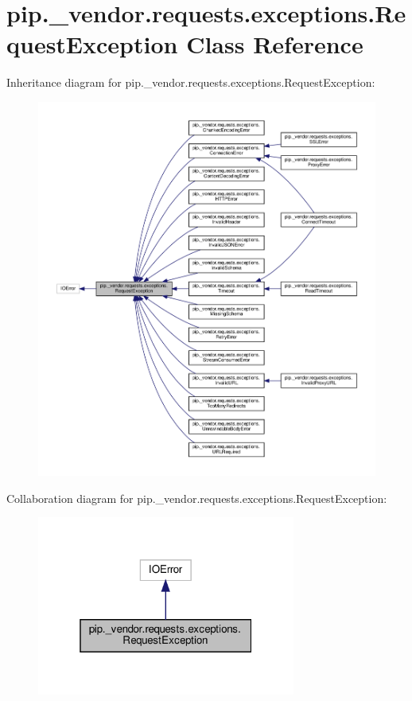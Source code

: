 \hypertarget{classpip_1_1__vendor_1_1requests_1_1exceptions_1_1RequestException}{}\section{pip.\+\_\+vendor.\+requests.\+exceptions.\+Request\+Exception Class Reference}
\label{classpip_1_1__vendor_1_1requests_1_1exceptions_1_1RequestException}


Inheritance diagram for pip.\+\_\+vendor.\+requests.\+exceptions.\+Request\+Exception\+:
\nopagebreak
\begin{figure}[H]
\begin{center}
\leavevmode
\includegraphics[width=350pt]{classpip_1_1__vendor_1_1requests_1_1exceptions_1_1RequestException__inherit__graph}
\end{center}
\end{figure}


Collaboration diagram for pip.\+\_\+vendor.\+requests.\+exceptions.\+Request\+Exception\+:
\nopagebreak
\begin{figure}[H]
\begin{center}
\leavevmode
\includegraphics[width=241pt]{classpip_1_1__vendor_1_1requests_1_1exceptions_1_1RequestException__coll__graph}
\end{center}
\end{figure}
